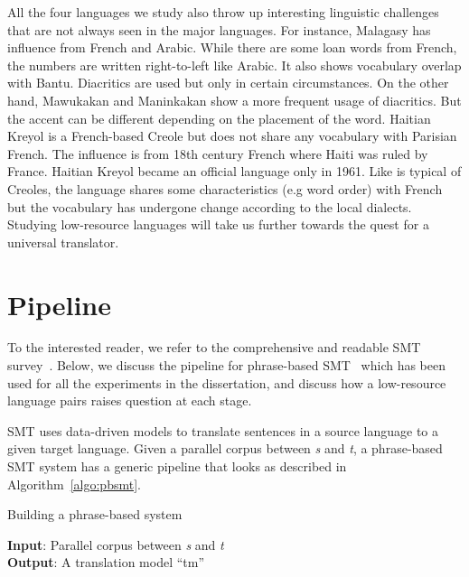 All the four languages we study also throw up interesting linguistic challenges that are not always seen in the major languages. For instance, Malagasy has influence from French and Arabic. While there are some loan words from French, the numbers are written right-to-left like Arabic. It also shows vocabulary overlap with Bantu. Diacritics are used but only in certain circumstances. On the other hand, Mawukakan and Maninkakan show a more frequent usage of diacritics. But the accent can be different depending on the placement of the word. Haitian Kreyol is a French-based Creole but does not share any vocabulary with Parisian French. The influence is from 18th century French where Haiti was ruled by France. Haitian Kreyol became an official language only in 1961. Like is typical of Creoles, the language shares some characteristics (e.g word order) with French but the vocabulary has undergone change according to the local dialects. Studying low-resource languages will take us further towards the quest for a universal translator. 

\section{Pipeline}
To the interested reader, we refer to the comprehensive and readable SMT survey~\cite{Lopez07asurvey}. Below, we discuss the pipeline for phrase-based SMT~\cite{Koehn:03} which has been used for all the experiments in the dissertation, and discuss how a low-resource language pairs raises question at each stage. 

SMT uses data-driven models to translate sentences in a source language to a given target language. Given a parallel corpus between \emph{s} and \emph{t}, a phrase-based SMT system has a generic pipeline that looks as described in Algorithm~\ref{algo:pbsmt}. 

\begin{algorithm}
\small
\caption{Building a phrase-based system}
\label{algo:pbsmt}
\textbf{Input}: Parallel corpus between \emph{s} and \emph{t} \\
\textbf{Output}: A translation model ``tm'' 
\begin{algorithmic}[l]
	 \label{aline:alignments}
	 \label{aline:scores}
	 \label{aline:MERT}
	 \label{aline:decoding}
\end{algorithmic}
\end{algorithm}

